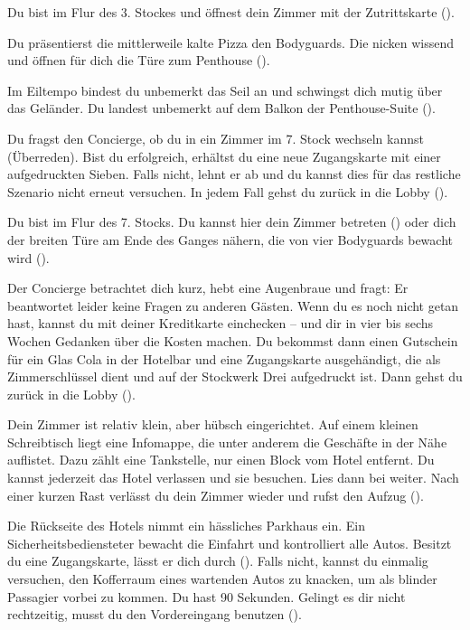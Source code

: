 {	%
	Du bist im Flur des 3. Stockes und öffnest dein Zimmer mit der Zutrittskarte ().

	Du präsentierst die mittlerweile kalte Pizza den Bodyguards. Die nicken wissend und öffnen für dich die Türe zum Penthouse ().

	Im Eiltempo bindest du unbemerkt das Seil an und schwingst dich mutig über das Geländer. Du landest unbemerkt auf dem Balkon der Penthouse-Suite ().

	Du fragst den Concierge, ob du in ein Zimmer im 7. Stock wechseln kannst  (Überreden). Bist du erfolgreich, erhältst du eine neue Zugangskarte mit einer aufgedruckten Sieben. Falls nicht, lehnt er ab und du kannst dies für das restliche Szenario nicht erneut versuchen. In jedem Fall gehst du zurück in die Lobby ().

	Du bist im Flur des 7. Stocks. Du kannst hier dein Zimmer betreten () oder dich der breiten Türe am Ende des Ganges nähern, die von vier Bodyguards bewacht wird ().

	Der Concierge betrachtet dich kurz, hebt eine Augenbraue und fragt:  Er beantwortet leider keine Fragen zu anderen Gästen. Wenn du es noch nicht getan hast, kannst du mit deiner Kreditkarte einchecken -- und dir in vier bis sechs Wochen Gedanken über die Kosten machen. Du bekommst dann einen Gutschein für ein Glas Cola in der Hotelbar und eine Zugangskarte ausgehändigt, die als Zimmerschlüssel dient und auf der Stockwerk Drei aufgedruckt ist. Dann gehst du zurück in die Lobby ().

	Dein Zimmer ist relativ klein, aber hübsch eingerichtet. Auf einem kleinen Schreibtisch liegt eine Infomappe, die unter anderem die Geschäfte in der Nähe auflistet. Dazu zählt eine Tankstelle, nur einen Block vom Hotel entfernt. Du kannst jederzeit das Hotel verlassen und sie besuchen. Lies dann bei  weiter. Nach einer kurzen Rast verlässt du dein Zimmer wieder und rufst den Aufzug ().

	Die Rückseite des Hotels nimmt ein hässliches Parkhaus ein. Ein Sicherheitsbediensteter bewacht die Einfahrt und kontrolliert alle Autos. Besitzt du eine Zugangskarte, lässt er dich durch (). Falls nicht, kannst du einmalig versuchen, den Kofferraum eines wartenden Autos zu knacken, um als blinder Passagier vorbei zu kommen. Du hast 90 Sekunden. Gelingt es dir nicht rechtzeitig, musst du den Vordereingang benutzen ().

}

